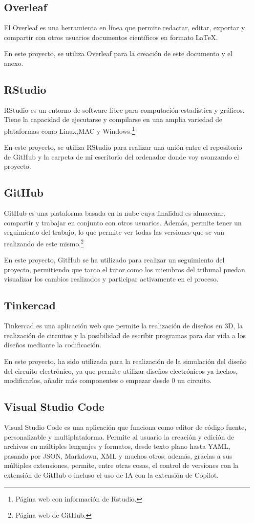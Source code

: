 \subsection{Overleaf}
El Overleaf es una herramienta en línea que permite redactar, editar, exportar y compartir con otros usuarios documentos científicos en formato LaTeX.

En este proyecto, se utiliza Overleaf para la creación de este documento y el anexo.
\subsection{RStudio}
RStudio es un entorno de software libre para computación estadística y gráficos. Tiene la capacidad de ejecutarse y compilarse en una amplia variedad de plataformas como Linux,MAC y Windows.\cite{Rstudio}\footnote{Página web con información de Rstudio\cite{Rstudio}.}

En este proyecto, se utiliza RStudio para realizar una unión entre el repositorio de GitHub y la carpeta de mi escritorio del ordenador donde voy avanzando el proyecto.
\subsection{GitHub}
GitHub es una plataforma basada en la nube cuya finalidad es almacenar, compartir y trabajar en conjunto con otros usuarios. 
Además, permite tener un seguimiento del trabajo, lo que permite ver todas las versiones que se van realizando de este mismo.\cite{GitHub}\footnote{Página web de GitHub\cite{GitHub}.} 

En este proyecto, GitHub se ha utilizado para realizar un seguimiento del proyecto, permitiendo que tanto el tutor como los miembros del tribunal puedan visualizar los cambios realizados y participar activamente en el proceso.
\subsection{Tinkercad}
Tinkercad es una aplicación web que permite la realización de diseños en 3D, la realización de circuitos y la posibilidad de escribir programas para dar vida a los diseños mediante la codificación.

En este proyecto, ha sido utilizada para la realización de la simulación del diseño del circuito electrónico, ya que permite utilizar diseños electrónicos ya hechos, modificarlos, añadir más componentes o empezar desde 0 un circuito.
\subsection{Visual Studio Code}
Visual Studio Code es una aplicación que funciona como editor de código fuente, personalizable y multiplataforma.
Permite al usuario la creación y edición de archivos en múltiples lenguajes y formatos, desde texto plano hasta YAML, pasando por JSON, Markdown, XML y muchos otros; además, gracias a sus múltiples extensiones, permite, entre otras cosas, el control de versiones con la extensión de GitHub o incluso el uso de IA con la extensión de Copilot.

